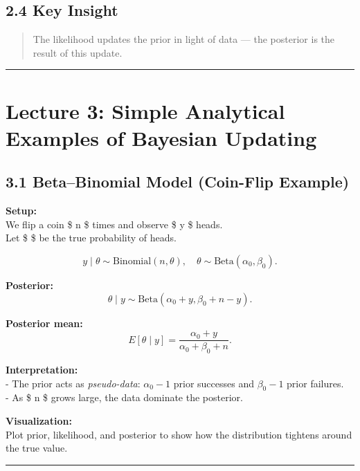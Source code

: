 \documentclass[
  letterpaper,
  DIV=11,
  numbers=noendperiod]{scrreprt}
\begin{document}
\subsection{2.4 Key Insight}\label{key-insight}

\begin{quote}
The likelihood updates the prior in light of data --- the posterior is
the result of this update.
\end{quote}

\begin{center}\rule{0.5\linewidth}{0.5pt}\end{center}

\section{Lecture 3: Simple Analytical Examples of Bayesian
Updating}\label{lecture-3-simple-analytical-examples-of-bayesian-updating}

\subsection{3.1 Beta--Binomial Model (Coin-Flip
Example)}\label{betabinomial-model-coin-flip-example}

\textbf{Setup:}\\
We flip a coin \$ n \$ times and observe \$ y \$ heads.\\
Let \$ \theta \$ be the true probability of heads.

\[
y \mid \theta \sim \text{Binomial}(n, \theta), \quad \theta \sim \text{Beta}(\alpha_0, \beta_0).
\]

\textbf{Posterior:} \[
\theta \mid y \sim \text{Beta}(\alpha_0 + y, \beta_0 + n - y).
\]

\textbf{Posterior mean:} \[
E[\theta \mid y] = \frac{\alpha_0 + y}{\alpha_0 + \beta_0 + n}.
\]

\textbf{Interpretation:}\\
- The prior acts as \emph{pseudo-data}: \(\alpha_0 - 1\) prior successes
and \(\beta_0 - 1\) prior failures.\\
- As \$ n \$ grows large, the data dominate the posterior.

\textbf{Visualization:}\\
Plot prior, likelihood, and posterior to show how the distribution
tightens around the true value.

\begin{center}\rule{0.5\linewidth}{0.5pt}\end{center}
\end{document}
